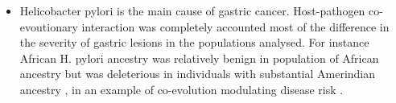 \begin{itemize}
\item Helicobacter pylori is the main cause of gastric cancer. Host-pathogen co-evoutionary interaction was completely accounted most of the difference in the severity of gastric lesions in the populations analysed. For instance African H. pylori ancestry was relatively benign in population of African ancestry but was deleterious in individuals with substantial Amerindian ancestry \cite{kodaman2014human}, in an example of co-evolution modulating disease risk \cite{kodaman2014human}.

\end{itemize}

%
%


